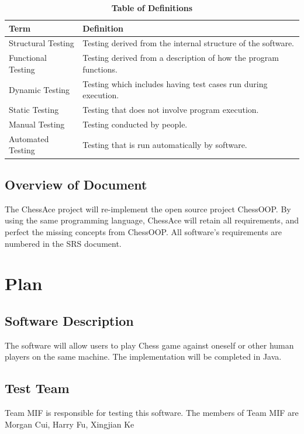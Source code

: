 \documentclass[12pt, titlepage]{article}
\begin{document}
\begin{table}[H]

	\begin{tabular}[pos]{|l|l|}
		\hline
		\textbf{Term}& \textbf{Definition} \\ \hline
		Structural Testing & Testing derived from the internal structure of the software. \\ \hline
		Functional Testing & Testing derived from a description of how the program functions.  \\ \hline 
		Dynamic Testing & Testing which includes having test cases run during execution. \\ \hline
		Static Testing & Testing that does not involve program execution.  \\ \hline  
		Manual Testing & Testing conducted by people. \\ \hline
		Automated Testing & Testing that is run automatically by software. \\ \hline 
	\end{tabular}
		\caption{\bf Table of Definitions}
		\label{table2}
\end{table}	


\subsection{Overview of Document}
The ChessAce project will re-implement the open source project ChessOOP. By using the same programming language, ChessAce will retain all requirements, and perfect the missing concepts from ChessOOP.  All software's requirements are numbered in the SRS document.
\section{Plan}
	
\subsection{Software Description}
The software will allow users to play Chess game against oneself or other human players on the same machine. The implementation will be completed in Java.

\subsection{Test Team}
Team MIF is responsible for testing this software. The members of Team MIF are Morgan Cui, Harry Fu, Xingjian Ke
\end{document}
